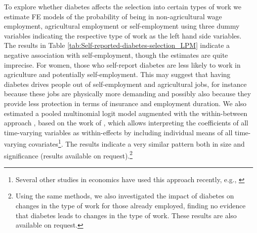 To explore whether diabetes affects the selection into certain types of work we estimate \ac{FE} models of the probability of being in non-agricultural wage employment, agricultural employment or self-employment using three dummy variables indicating the respective type of work as the left hand side variables. The results in Table \ref{tab:Self-reported-diabetes-selection_LPM} indicate a negative association with self-employment, though the estimates are quite imprecise. For women, those who self-report diabetes are less likely to work in agriculture and potentially self-employment. This may suggest that having diabetes drives people out of self-employment and agricultural jobs, for instance because these jobs are physically more demanding and possibly also because they provide less protection in terms of insurance and employment duration. We also estimated a pooled multinomial logit model augmented  with the within-between approach \parencite{Bell2015}, based on the work of \textcite{Mundlak1978}, which allows interpreting the coefficients of all time-varying variables as within-effects by including individual means of all time-varying covariates\footnote{Several other studies in economics have used this approach recently, e.g., \textcite{Geishecker2011,Wunder2014,Boll2016}}. The results indicate a very similar pattern both in size and significance (results available on request).\footnote{Using the same methods, we also investigated the impact of diabetes on changes in the type of work for those already employed, finding no evidence that diabetes leads to changes in the type of work. These results are also available on request.}

